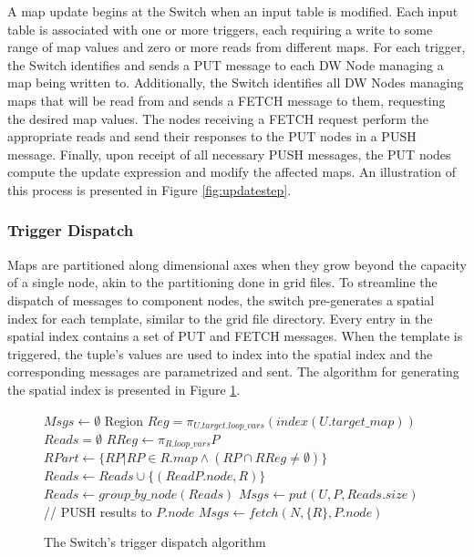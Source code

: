 \documentclass{sig-alternate}
\begin{document}
A map update begins at the Switch when an input table is modified.  Each input table is associated with one or more triggers, each requiring a write to some range of map values and zero or more reads from different maps.  For each trigger, the Switch identifies and sends a PUT message to each DW Node managing a map being written to.  Additionally, the Switch identifies all DW Nodes managing maps that will be read from and sends a FETCH message to them, requesting the desired map values.  The nodes receiving a FETCH request perform the appropriate reads and send their responses to the PUT nodes in a PUSH message.  Finally, upon receipt of all necessary PUSH messages, the PUT nodes compute the update expression and modify the affected maps.  An illustration of this process is presented in Figure \ref{fig:updatestep}.  

\subsubsection{Trigger Dispatch}
Maps are partitioned along dimensional axes when they grow beyond the capacity of a single node, akin to the partitioning done in grid files\cite{318586}.  To streamline the dispatch of messages to component nodes, the switch pre-generates a spatial index for each template, similar to the grid file directory.  Every entry in the spatial index contains a set of PUT and FETCH messages.  When the template is triggered, the tuple's values are used to index into the spatial index and the corresponding messages are parametrized and sent.  The algorithm for generating the spatial index is presented in Figure \ref{alg:dispatch}.

\begin{figure}
\begin{algorithmic}[1]
\STATE $Msgs \leftarrow \emptyset$
	\STATE Region $Reg = \pi_{U.target.loop\_vars} \left(index(U.target\_map)\right)$
		\STATE $Reads = \emptyset$
			\STATE $RReg \leftarrow \pi_{R.loop\_vars} P$
			\STATE $RPart \leftarrow \{RP | RP\in R.map \wedge (RP \cap RReg \neq \emptyset)\}$
			\STATE $Reads \leftarrow Reads \cup \{(ReadP.node, R)\}$
		\ENDFOR
		\STATE $Reads \leftarrow group\_by\_node(Reads)$
		\STATE $Msgs \leftarrow put(U, P, Reads.size)$
		  \STATE // PUSH results to $P.node$
			\STATE $Msgs \leftarrow fetch(N, \{R\}, P.node)$
		\ENDFOR
	\ENDFOR
\ENDFOR
\end{algorithmic}
\caption{The Switch's trigger dispatch algorithm}
\label{alg:dispatch}
\end{figure}
\end{document}
